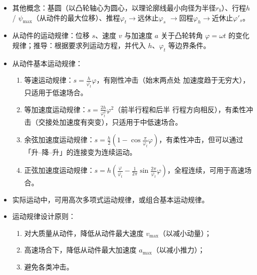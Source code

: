 \documentclass[12pt,a4paper]{article}
\newcommand{\tightlist}{\setlength{\parskip}{0pt}\setlength{\itemsep}{0pt}}
\newcommand{\hint}[1]{\textsf{（#1）}}
\newcommand{\then}{$\to$}
\begin{document}
\begin{itemize}
    \item 其他概念：基圆\hint{以凸轮轴心为圆心，以理论廓线最小向径为半径$r_b$}、行程$h$/
    $\psi_\text{max}$\hint{从动件的最大位移}、推程$\varphi_t$\then 远休止$\varphi_s$
    \then 回程$\varphi_h$\then 近休止$\varphi'_s$。
    \item 从动件的运动规律：位移 $s$、速度 $v$ 与加速度 $a$ 关于凸轮转角 $\varphi=\omega
    t$ 的变化规律；推导：根据要求列运动方程，并代入 $h$、$\varphi_t$ 等边界条件。
    \item 从动件基本运动规律：
    \begin{enumerate}\tightlist
        \item 等速运动规律：$s=\frac h{\varphi_t}\varphi$，有刚性冲击\hint{始末两点处
        加速度趋于无穷大}，只适用于低速场合。
        \item 等加速度运动规律：$s=\frac{2h}{\varphi_t^2}\varphi^2$\hint{前半行程和后半
        行程方向相反}，有柔性冲击\hint{交接处加速度有突变}，只适用于中低速场合。
        \item 余弦加速度运动规律：$s=\frac h2\left(1-\cos\frac\pi{\varphi_t}\varphi
        \right)$，有柔性冲击，但可以通过「升--降--升」的连接变为连续运动。
        \item 正弦加速度运动规律：$s=h\left(\frac\varphi{\varphi_t}-\frac1{2\pi}\sin
        \frac{2\pi}{\varphi_t}\varphi\right)$，全程连续，可用于高速场合。
    \end{enumerate}
    \item 实际运动中，可用高次多项式运动规律，或组合基本运动规律。
    \item 运动规律设计原则：
    \begin{enumerate}\tightlist
        \item 对大质量从动件，降低从动件最大速度 $v_\text{max}$\hint{以减小动量}；
        \item 高速场合下，降低从动件最大加速度 $a_\text{max}$\hint{以减小推力}；
        \item 避免各类冲击。
    \end{enumerate}
\end{itemize}
\end{document}
